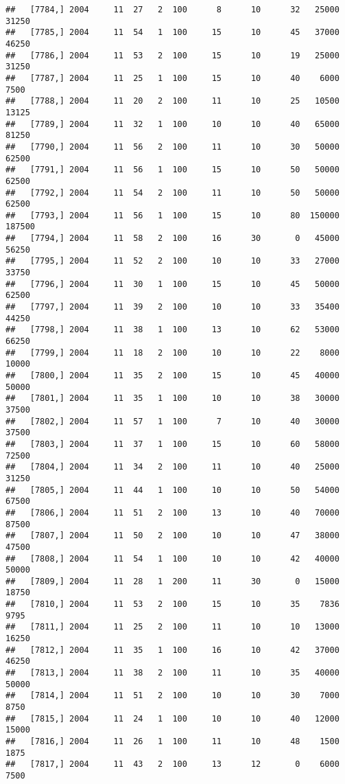 \documentclass{article}\usepackage[]{graphicx}\usepackage[]{color}
\makeatletter
\newenvironment{kframe}{%
 \def\at@end@of@kframe{}%
 \ifinner\ifhmode%
  \def\at@end@of@kframe{\end{minipage}}%
  \begin{minipage}{\columnwidth}%
 \fi\fi%
 \def\FrameCommand##1{\hskip\@totalleftmargin \hskip-\fboxsep
 \colorbox{shadecolor}{##1}\hskip-\fboxsep
     \hskip-\linewidth \hskip-\@totalleftmargin \hskip\columnwidth}%
 \MakeFramed {\advance\hsize-\width
   \@totalleftmargin\z@ \linewidth\hsize
   \@setminipage}}%
 {\par\unskip\endMakeFramed%
 \at@end@of@kframe}
\newenvironment{knitrout}{}{} %
\makeatother
\begin{document}
\begin{knitrout}
\begin{kframe}
\begin{verbatim}
##   [7784,] 2004     11  27   2  100      8      10      32   25000   31250
##   [7785,] 2004     11  54   1  100     15      10      45   37000   46250
##   [7786,] 2004     11  53   2  100     15      10      19   25000   31250
##   [7787,] 2004     11  25   1  100     15      10      40    6000    7500
##   [7788,] 2004     11  20   2  100     11      10      25   10500   13125
##   [7789,] 2004     11  32   1  100     10      10      40   65000   81250
##   [7790,] 2004     11  56   2  100     11      10      30   50000   62500
##   [7791,] 2004     11  56   1  100     15      10      50   50000   62500
##   [7792,] 2004     11  54   2  100     11      10      50   50000   62500
##   [7793,] 2004     11  56   1  100     15      10      80  150000  187500
##   [7794,] 2004     11  58   2  100     16      30       0   45000   56250
##   [7795,] 2004     11  52   2  100     10      10      33   27000   33750
##   [7796,] 2004     11  30   1  100     15      10      45   50000   62500
##   [7797,] 2004     11  39   2  100     10      10      33   35400   44250
##   [7798,] 2004     11  38   1  100     13      10      62   53000   66250
##   [7799,] 2004     11  18   2  100     10      10      22    8000   10000
##   [7800,] 2004     11  35   2  100     15      10      45   40000   50000
##   [7801,] 2004     11  35   1  100     10      10      38   30000   37500
##   [7802,] 2004     11  57   1  100      7      10      40   30000   37500
##   [7803,] 2004     11  37   1  100     15      10      60   58000   72500
##   [7804,] 2004     11  34   2  100     11      10      40   25000   31250
##   [7805,] 2004     11  44   1  100     10      10      50   54000   67500
##   [7806,] 2004     11  51   2  100     13      10      40   70000   87500
##   [7807,] 2004     11  50   2  100     10      10      47   38000   47500
##   [7808,] 2004     11  54   1  100     10      10      42   40000   50000
##   [7809,] 2004     11  28   1  200     11      30       0   15000   18750
##   [7810,] 2004     11  53   2  100     15      10      35    7836    9795
##   [7811,] 2004     11  25   2  100     11      10      10   13000   16250
##   [7812,] 2004     11  35   1  100     16      10      42   37000   46250
##   [7813,] 2004     11  38   2  100     11      10      35   40000   50000
##   [7814,] 2004     11  51   2  100     10      10      30    7000    8750
##   [7815,] 2004     11  24   1  100     10      10      40   12000   15000
##   [7816,] 2004     11  26   1  100     11      10      48    1500    1875
##   [7817,] 2004     11  43   2  100     13      12       0    6000    7500

\end{verbatim}
\end{kframe}
\end{knitrout}
\end{document}
